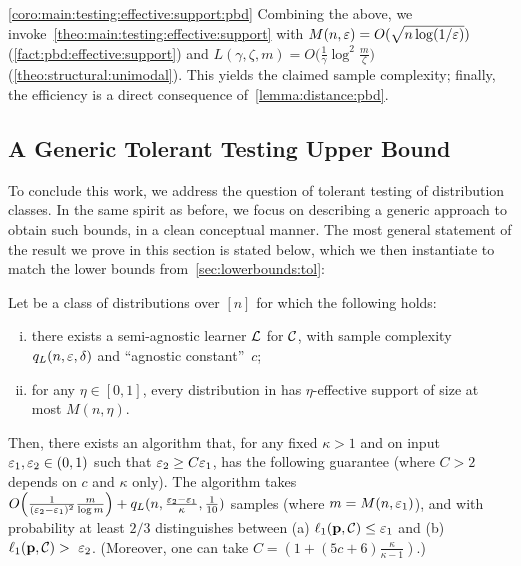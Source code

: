 \begin{proofof}{\cref{coro:main:testing:effective:support:pbd}}
Combining the above, we invoke~\cref{theo:main:testing:effective:support} with $M(n,\eps)=O( \sqrt{n\log(1/\eps)} )$ (\cref{fact:pbd:effective:support}) and $L(\gamma,\zeta,m)=O\big( \frac{1}{\gamma}\log^2 \frac{m}{\zeta} \big)$ (\cref{theo:structural:unimodal}). This yields the claimed sample complexity; finally, the efficiency is a direct consequence of~\cref{lemma:distance:pbd}.
\end{proofof}
 
 
 
 
\subsection{A Generic Tolerant Testing Upper Bound}\label{sec:toltesting:ub}
To conclude this work, we address the question of tolerant testing of distribution classes. In the same spirit as before, we focus on describing a generic approach to obtain such bounds, in a clean conceptual manner. The most general statement of the result we prove in this section is stated below, which we then instantiate to match the lower bounds from~\cref{sec:lowerbounds:tol}:

\begin{theorem}\label{theo:main:tol:testing:ub:almost}
Let \class be a class of distributions over $[n]$ for which the following holds: 
  \begin{enumerate}[(i)]
    \item there exists a semi-agnostic learner $\Learner$ for $\class$, with sample complexity $q_L(n,\eps, \delta)$ and ``agnostic constant''~$c$;
    \item for any $\eta\in[0,1]$, every distribution in \class has $\eta$-effective support of size at most $M(n,\eta)$.
  \end{enumerate}
Then, there exists an algorithm that, for any fixed $\kappa > 1$ and on input $\eps_1,\eps_2 \in (0,1)$ such that $\eps_2 \geq C \eps_1$, has the following guarantee (where $C > 2$ depends on $c$ and $\kappa$ only). The algorithm takes $\bigO{\frac{1}{(\eps_2-\eps_1)^2}\frac{m}{\log m}} + q_L(n,\frac{\eps_2-\eps_1}{\kappa}, \frac{1}{10})$ samples (where $m=M(n,\eps_1)$), and with probability at least $2/3$ distinguishes between \textsf{(a)} $\lp[1](\D,\class) \leq \eps_1$ and \textsf{(b)} $\lp[1](\D,\class) >~\eps_2$. (Moreover, one can take $C=(1+(5c+6)\frac{\kappa}{\kappa-1})$.)
\end{theorem}

